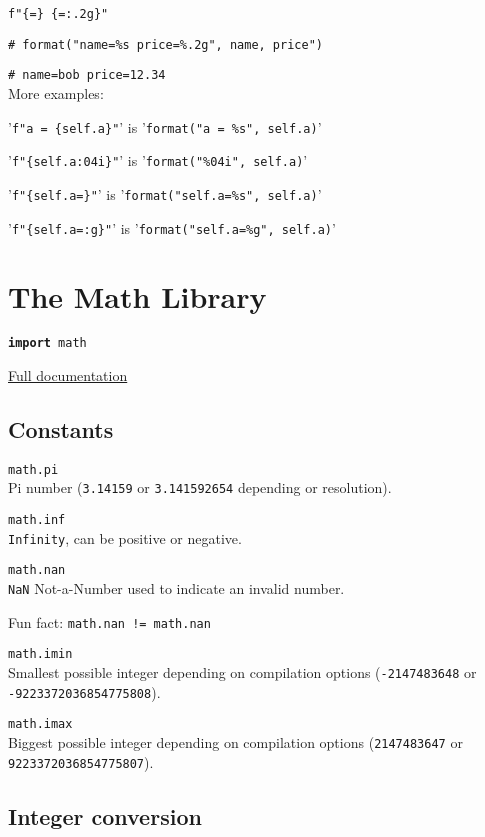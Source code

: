 \texttt{f"\{}\texttt{=\} \{}\texttt{=:.2g\}"}

\texttt{\# format("name=\%s price=\%.2g", name, price")}

\texttt{\# name=bob price=12.34}\\

\hangpar More examples:

'\texttt{f"a = \{self.a\}"}' is  '\texttt{format("a = \%s", self.a)}'

'\texttt{f"\{self.a:04i\}"}' is  '\texttt{format("\%04i", self.a)}'

'\texttt{f"\{self.a=\}"}' is  '\texttt{format("self.a=\%s", self.a)}'

'\texttt{f"\{self.a=:g\}"}' is  '\texttt{format("self.a=\%g", self.a)}'

\section*{The Math Library}

\hangpar \texttt{\textbf{import} math}

\hangpar \href{https://github.com/berry-lang/berry/wiki/Chapter-7\#math-module}{Full documentation}

\subsection*{Constants}

\hangpar \texttt{math.pi}\\
Pi number (\texttt{3.14159} or \texttt{3.141592654} depending or resolution).

\hangpar \texttt{math.inf}\\
\texttt{Infinity}, can be positive or negative.

\hangpar \texttt{math.nan}\\
\texttt{NaN} Not-a-Number used to indicate an invalid number.

Fun fact: \texttt{math.nan != math.nan}

\hangpar \texttt{math.imin}\\
Smallest possible integer depending on compilation options (\texttt{-2147483648} or \texttt{-9223372036854775808}).

\hangpar \texttt{math.imax}\\
Biggest possible integer depending on compilation options (\texttt{2147483647} or \texttt{9223372036854775807}).

\subsection*{Integer conversion}


